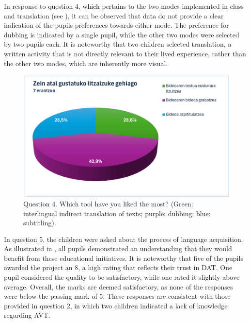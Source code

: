 In response to question 4, which pertains to the two modes implemented
in class and translation (see ), it can be observed that data do
not provide a clear indication of the pupils\textquotesingle{}
preferences towards either mode. The preference for dubbing is indicated
by a single pupil, while the other two modes were selected by two pupils
each. It is noteworthy that two children selected translation, a written
activity that is not directly relevant to their lived experience, rather
than the other two modes, which are inherently more visual.

\begin{figure}[htbp]
    \centering
    \begin{minipage}{.5\textwidth}
    \includegraphics[width=\textwidth]{fig04.png}
    \caption{Question 4. Which tool have you liked the most?
    (Green: interlingual indirect translation of texts; purple: dubbing;
    blue: subtitling).}
    \label{fig-04}
    \end{minipage}
\end{figure}


In question 5, the children were asked about the process of language
acquisition. As illustrated in , all pupils demonstrated an
understanding that they would benefit from these educational
initiatives. It is noteworthy that five of the pupils awarded the
project an 8, a high rating that reflects their trust in DAT. One pupil
considered the quality to be satisfactory, while one rated it slightly
above average. Overall, the marks are deemed satisfactory, as none of
the responses were below the passing mark of 5. These responses are
consistent with those provided in question 2, in which two children
indicated a lack of knowledge regarding AVT.

